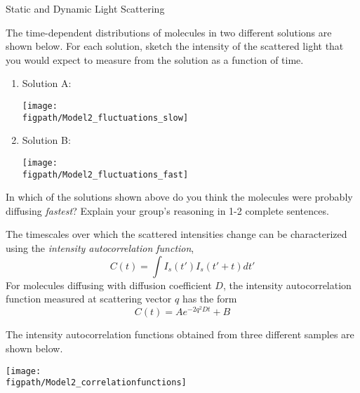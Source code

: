 \begin{activity}{Static and Dynamic Light Scattering}
\begin{ctqs}
	\question The time-dependent distributions of molecules in two different solutions are shown below.  For each solution, sketch the intensity of the scattered light that you would expect to measure from the solution as a function of time.
	
		\begin{enumerate}
			\item Solution A:
			
			\vspace{6pt}
			\centerline{\texttt{[image: \\figpath/Model2\_fluctuations\_slow]}}
			\vspace{6pt}
			
			\item Solution B:
			
			\vspace{6pt}
			\centerline{\texttt{[image: \\figpath/Model2\_fluctuations\_fast]}}
		\end{enumerate}
		
	\question In which of the solutions shown above do you think the molecules were probably diffusing \emph{fastest}?  Explain your group's reasoning in 1-2 complete sentences.
	
		\begin{solution}[1.5in]{}
		\end{solution}
	
\end{ctqs}

\clearpage
\begin{infobox}
	The timescales over which the scattered intensities change can be characterized using the \textit{intensity autocorrelation function},
	\begin{equation*}
		C(t) = \int I_s(t') I_s(t'+t)dt'
	\end{equation*}
	For molecules diffusing with diffusion coefficient $D$, the intensity autocorrelation function measured at scattering vector $q$ has the form
	\begin{equation*}
		C(t) = A e^{-2 q^2 D t} + B
	\end{equation*}
\end{infobox}

\begin{ctqs}
	\question The intensity autocorrelation functions obtained from three different samples are shown below.
	
			\vspace{6pt}
			\centerline{\texttt{[image: \\figpath/Model2\_correlationfunctions]}}	
	

\end{ctqs}
\end{activity}
